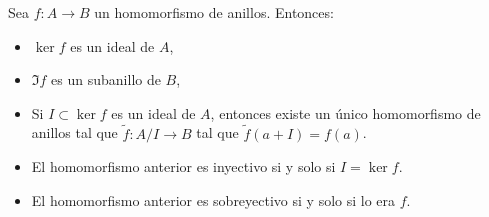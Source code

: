   \begin{teo}
    Sea \(f:A\longrightarrow B\) un homomorfismo de anillos. Entonces:
    \begin{itemize}
      \item \(\ker f\) es un ideal de \(A\),
      \item \(\Im f\) es un subanillo de \(B\),
      \item Si \(I\subset \ker f\) es un ideal de \(A\), entonces
        existe un único homomorfismo de anillos tal que
        \(\tilde{f}:A/I\longrightarrow B\) tal que \(\tilde{f}(a+I)=f(a)\).
      \item El homomorfismo anterior es inyectivo si y solo si
        \(I=\ker f\).
      \item El homomorfismo anterior es sobreyectivo si y solo si lo era
        \(f\).
    \end{itemize}
  \end{teo}

